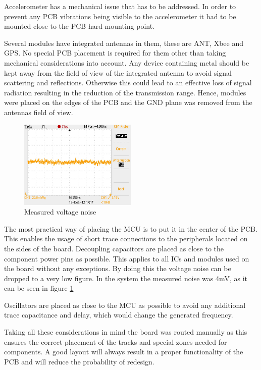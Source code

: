 Accelerometer has a mechanical issue that has to be addressed. In order to prevent any PCB vibrations being visible to the accelerometer it had to be mounted close to the PCB hard mounting point. 

Several modules have integrated antennas in them, these are ANT, Xbee and GPS. No special PCB placement is required for them other than taking mechanical considerations into account. Any device containing metal should be kept away from the field of view of the integrated antenna to avoid signal scattering and reflections. Otherwise this could lead to an effective loss of signal radiation resulting in the reduction of the transmission range. Hence, modules were placed on the edges of the PCB and the GND plane was removed from the antennas field of view. 

\begin{figure}
\centering
\includegraphics[width=0.5\textwidth]{Images/voltage_noise.jpg}
\caption{Measured voltage noise}
\label{fig:voltage_noise}
\end{figure}

The most practical way of placing the MCU is to put it in the center of the PCB. This enables the usage of short trace connections to the peripherals located on the sides of the board. Decoupling capacitors are placed as close to the component power pins as possible. This applies to all ICs and modules used on the board without any exceptions. By doing this the voltage noise can be dropped to a very low figure. In the system the measured noise was 4mV, as it can be seen in figure \ref{fig:voltage_noise}

Oscillators are placed as close to the MCU as possible to avoid any additional trace capacitance and delay, which would change the generated frequency. 

Taking all these considerations in mind the board was routed manually as this ensures the correct placement of the tracks and special zones needed for components. A good layout will always result in a proper functionality of the PCB and will reduce the probability of redesign.


